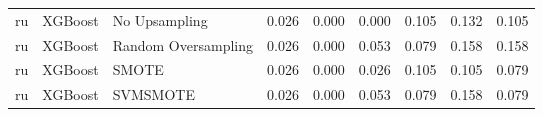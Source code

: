 \begin{tabular}{lllllllll}
      ru &                      XGBoost &       No Upsampling & 0.026 &                     0.000 &                 0.000 &                  0.105 &                                   0.132 &     0.105 \\
      ru &                      XGBoost & Random Oversampling & 0.026 &                     0.000 &                 0.053 &                  0.079 &                                   0.158 &     0.158 \\
      ru &                      XGBoost &               SMOTE & 0.026 &                     0.000 &                 0.026 &                  0.105 &                                   0.105 &     0.079 \\
      ru &                      XGBoost &            SVMSMOTE & 0.026 &                     0.000 &                 0.053 &                  0.079 &                                   0.158 &     0.079 \\
\bottomrule
\end{tabular}
